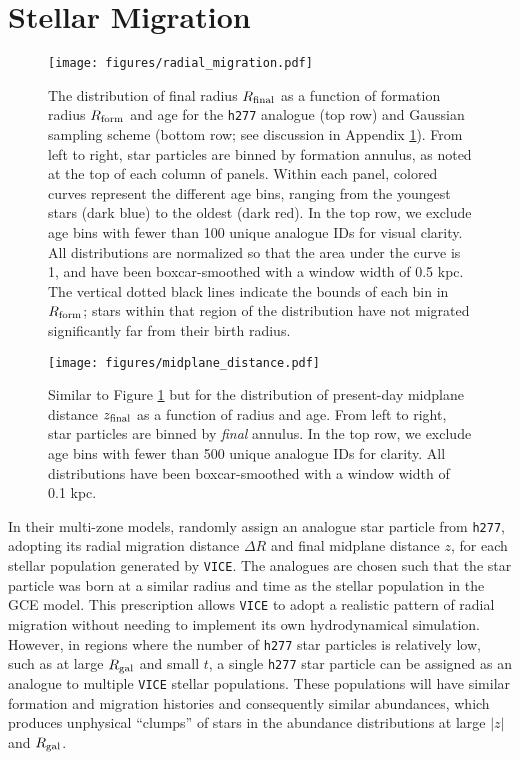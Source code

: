 \documentclass[twocolumn,twocolappendix,linenumbers]{aastex631}
\newcommand{\vice}{{\tt VICE}\xspace}
\newcommand{\hydro}{{\tt h277}\xspace}
\begin{document}
\section{Stellar Migration}
\label{app:migration}

\begin{figure*}
    \centering
    \texttt{[image: figures/radial\_migration.pdf]}
    \caption{The distribution of final radius $R_{\rm final}$ as a function of formation radius $R_{\rm form}$ and age for the \hydro analogue (top row) and Gaussian sampling scheme (bottom row; see discussion in Appendix \ref{app:migration}). From left to right, star particles are binned by formation annulus, as noted at the top of each column of panels. Within each panel, colored curves represent the different age bins, ranging from the youngest stars (dark blue) to the oldest (dark red). In the top row, we exclude age bins with fewer than 100 unique analogue IDs for visual clarity. All distributions are normalized so that the area under the curve is 1, and have been boxcar-smoothed with a window width of 0.5 kpc. The vertical dotted black lines indicate the bounds of each bin in $R_{\rm form}$; stars within that region of the distribution have not migrated significantly far from their birth radius.}
    \label{fig:radial-migration}
\end{figure*}

\begin{figure*}
    \centering
    \texttt{[image: figures/midplane\_distance.pdf]}
    \caption{Similar to Figure \ref{fig:radial-migration} but for the distribution of present-day midplane distance $z_{\rm final}$ as a function of radius and age. From left to right, star particles are binned by \textit{final} annulus. In the top row, we exclude age bins with fewer than 500 unique analogue IDs for clarity. All distributions have been boxcar-smoothed with a window width of 0.1 kpc.}
    \label{fig:midplane-distance}
\end{figure*}

In their multi-zone models,  randomly assign an analogue star particle from \hydro, adopting its radial migration distance $\Delta R$ and final midplane distance $z$, for each stellar population generated by \vice. The analogues are chosen such that the star particle was born at a similar radius and time as the stellar population in the GCE model. This prescription allows \vice to adopt a realistic pattern of radial migration without needing to implement its own hydrodynamical simulation. However, in regions where the number of \hydro star particles is relatively low, such as at large $R_{\rm gal}$ and small $t$, a single \hydro star particle can be assigned as an analogue to multiple \vice stellar populations. These populations will have similar formation and migration histories and consequently similar abundances, which produces unphysical ``clumps'' of stars in the abundance distributions at large $|z|$ and $R_{\rm gal}$.
\end{document}
